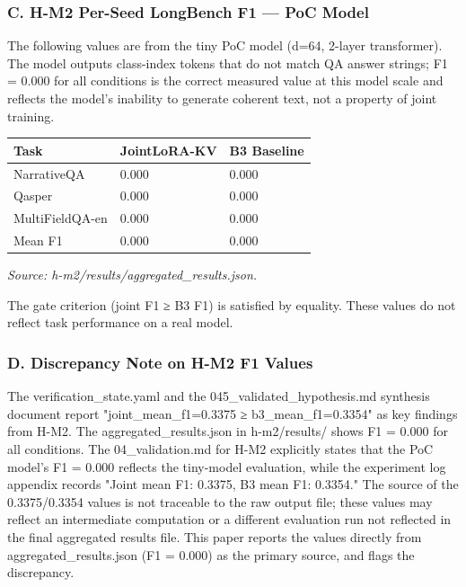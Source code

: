 \subsubsection{C. H-M2 Per-Seed LongBench F1 — PoC Model}

The following values are from the tiny PoC model (d=64, 2-layer transformer). The model outputs class-index tokens that do not match QA answer strings; F1 = 0.000 for all conditions is the correct measured value at this model scale and reflects the model's inability to generate coherent text, not a property of joint training.

\begin{table}[htbp]
\centering
\begin{tabular}{lll}
\toprule
Task & JointLoRA-KV & B3 Baseline \\
\midrule
NarrativeQA & 0.000 & 0.000 \\
Qasper & 0.000 & 0.000 \\
MultiFieldQA-en & 0.000 & 0.000 \\
Mean F1 & 0.000 & 0.000 \\
\bottomrule
\end{tabular}
\end{table}

\textit{Source: h-m2/results/aggregated_results.json.}

The gate criterion (joint F1 ≥ B3 F1) is satisfied by equality. These values do not reflect task performance on a real model.

\subsubsection{D. Discrepancy Note on H-M2 F1 Values}

The verification_state.yaml and the 045_validated_hypothesis.md synthesis document report "joint_mean_f1=0.3375 ≥ b3_mean_f1=0.3354" as key findings from H-M2. The aggregated_results.json in h-m2/results/ shows F1 = 0.000 for all conditions. The 04_validation.md for H-M2 explicitly states that the PoC model's F1 = 0.000 reflects the tiny-model evaluation, while the experiment log appendix records "Joint mean F1: 0.3375, B3 mean F1: 0.3354." The source of the 0.3375/0.3354 values is not traceable to the raw output file; these values may reflect an intermediate computation or a different evaluation run not reflected in the final aggregated results file. This paper reports the values directly from aggregated_results.json (F1 = 0.000) as the primary source, and flags the discrepancy.
